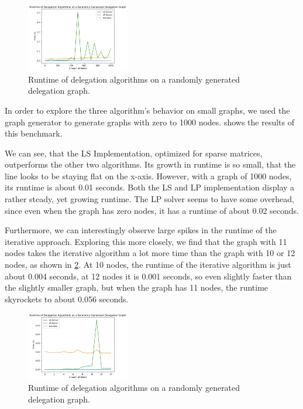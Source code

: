 \begin{figure}[h]
    \centering
    \includegraphics[width=0.4\textwidth]{0-1000_random}
    \caption{Runtime of delegation algorithms on a randomly generated delegation graph.}
    \label{fig:random-small}
\end{figure}

In order to explore the three algorithm's behavior on small graphs, we used the graph generator to generate graphs with zero to 1000 nodes.  shows the results of this benchmark.

We can see, that the LS Implementation, optimized for sparse matrices, outperforms the other two algorithms. Its growth in runtime is so small, that the line looks to be staying flat on the x-axis. However, with a graph of 1000 nodes, its runtime is about 0.01 seconds. Both the LS and LP implementation display a rather steady, yet growing runtime. The LP solver seems to have some overhead, since even when the graph has zero nodes, it has a runtime of about 0.02 seconds.

Furthermore, we can interestingly observe large spikes in the runtime of the iterative approach. Exploring this more closely, we find that the graph with 11 nodes takes the iterative algorithm a lot more time than the graph with 10 or 12 nodes, as shown in \cref{fig:random-tiny}. At 10 nodes, the runtime of the iterative algorithm is just about 0.004 seconds, at 12 nodes it is 0.001 seconds, so even slightly faster than the slightly smaller graph, but when the graph has 11 nodes, the runtime skyrockets to about 0.056 seconds.

\begin{figure}[h]
    \centering
    \includegraphics[width=0.4\textwidth]{0-15_random}
    \caption{Runtime of delegation algorithms on a randomly generated delegation graph.}
    \label{fig:random-tiny}
\end{figure}

